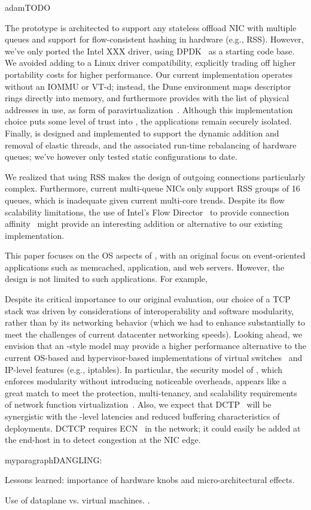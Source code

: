 
adam{TODO}




 The \ix prototype is
architected to support any stateless offload NIC with multiple queues
and support for flow-consistent hashing in hardware (e.g., RSS).
However, we've only ported the Intel XXX driver, using
DPDK~\cite{intel:dpdk} as a starting code base.  We avoided adding to
\ix a Linux driver compatibility, explicitly trading off higher
portability costs for higher performance.  Our current implementation
operates without an IOMMU or VT-d; instead, the Dune environment maps
descriptor rings directly into \ix memory, and furthermore provides
\ix with the list of physical addresses in use, as form of
paravirtualization~\cite{DBLP:conf/sosp/BarhamDFHHHN03}.  Although
this implementation choice puts some level of trust into \ix, the
applications remain securely isolated.  Finally, \ix is designed and
implemented to support the dynamic addition and removal of elastic
threads, and the associated run-time rebalancing of hardware queues;
we've however only tested static configurations to date. 

 We realized that using RSS
makes the design of outgoing connections particularly complex.
Furthermore, current multi-queue NICs only support RSS groups of 16
queues, which is inadequate given current multi-core trends.  Despite
its flow scalability limitations, the use of Intel's Flow
Director~\cite{intel:82599} to provide connection
affinity~\cite{DBLP:conf/eurosys/PesterevSZM12} might provide an
interesting addition or alternative to our existing implementation.


 This paper focuses on the
OS aspects of \ix, with an original focus on event-oriented
applications such as memcached, application, and web servers.
However, the \ix design is not limited to such applications.  For
example, 

Despite its critical importance to our original evaluation, our choice
of a TCP stack was driven by considerations of interoperability and
software modularity, rather than by its networking behavior (which we
had to enhance substantially to meet the challenges of current
datacenter networking speeds).  Looking ahead, we envision that an
\ix-style model may provide a higher performance alternative to the
current OS-based and hypervisor-based implementations of virtual
switches~\cite{openvswitch} and IP-level features (e.g., iptables).
In particular, the security model of \ix, which enforces modularity
without introducing noticeable overheads, appears like a great match
to meet the protection, multi-tenancy, and scalability requirements of
network function virtualization~\cite{etsi:NFV}.  Also, we expect that
DCTP~\cite{DBLP:conf/sigcomm/AlizadehGMPPPSS10} will be synergistic
with the \microsecond-level latencies and reduced buffering
characteristics of \ix deployments.  DCTCP requires
ECN~\cite{ramakrishnan2001addition} in the network; it could easily be
added at the end-host in \ix to detect congestion at the NIC edge.


myparagraph{DANGLING:}


\todo Lessons learned: importance of hardware knobs and micro-architectural effects.


\todo Use of dataplane vs. virtual machines. 
.
